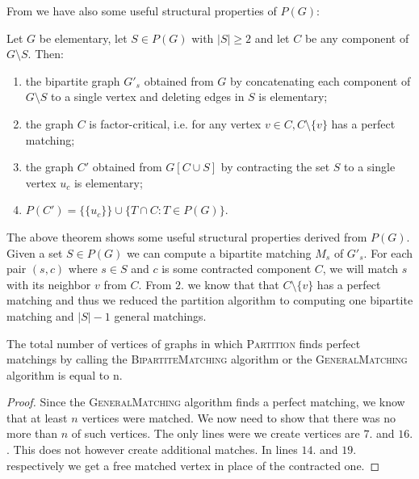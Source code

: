 From \cite{lovasz2} we have also some useful structural properties of $P(G)$:
\begin{theorem}
Let $G$ be elementary, let $S\in P(G)$ with $|S|\ge2$ and let $C$ be any component of $G\setminus S$. Then:
\begin{enumerate}
    \item the bipartite graph $G'_s$ obtained from $G$ by concatenating each component of $G\setminus S$ to a single vertex and deleting edges in $S$ is elementary;
    \item the graph $C$ is factor-critical, i.e. for any vertex $v\in C, C\setminus\{v\}$ has a perfect matching;
    \item the graph $C'$ obtained from $G[C\cup S]$ by contracting the set $S$ to a single vertex $u_c$ is elementary;
    \item $P(C') = \{\{u_c\}\}\cup\{T\cap C\colon T\in P(G)\}$.
\end{enumerate}
\end{theorem}
The above theorem shows some useful structural properties derived from $P(G)$. Given a set $S \in P(G)$ we can compute a bipartite matching $M_s$ of $G'_s$. For each pair $(s,c)$ where $s\in S$ and $c$ is some contracted component $C$, we will match $s$ with its neighbor $v$ from $C$. From $2.$ we know that that $C\setminus \{v\}$ has a perfect matching and thus we reduced the partition algorithm to computing one bipartite matching and $|S|-1$ general matchings.

\begin{lemma}\label{partition_n_vertices}
The total number of vertices of graphs in which \textsc{Partition} finds perfect matchings by calling the \textsc{BipartiteMatching} algorithm or the \textsc{GeneralMatching} algorithm is equal to n.
\end{lemma}
\begin{proof}
Since the \textsc{GeneralMatching} algorithm finds a perfect matching, we know that at least $n$ vertices were matched.
We now need to show that there was no more than $n$ of such vertices.
The only lines were we create vertices are $7.$ and $16.$. This does not however create additional matches. In lines $14.$ and $19.$ respectively we get a free matched vertex in place of the contracted one.
\end{proof}

